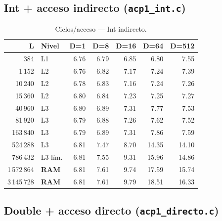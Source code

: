 \documentclass[12pt,a4paper]{article}
\newcommand{\cverde}[1]{\textcolor{verde}{#1}}
\newcommand{\cnaranja}[1]{\textcolor{naranja}{#1}}
\newcommand{\crojo}[1]{\textcolor{rojo}{#1}}
\begin{document}
\subsection{Int + acceso indirecto (\texttt{acp1\_int.c})}

\begin{table}[H]
\centering
\caption{Ciclos/acceso --- Int indirecto.}
\label{tab:int_ind}
\setlength{\tabcolsep}{5pt}\footnotesize
\begin{tabular}{rlrrrrr}
\toprule
\textbf{L} & \textbf{Nivel} & \textbf{D=1} & \textbf{D=8} & \textbf{D=16} & \textbf{D=64} & \textbf{D=512} \\
\midrule
384         & L1           & \cverde{6.76}  & \cverde{6.79}  & \cverde{6.85}  & \cverde{6.80}  & \cverde{7.55} \\
1\,152      & L2           & \cverde{6.76}  & \cverde{6.82}  & \cverde{7.17}  & \cverde{7.24}  & \cverde{7.39} \\
10\,240     & L2           & \cverde{6.78}  & \cverde{6.83}  & \cverde{7.16}  & \cverde{7.24}  & \cverde{7.26} \\
15\,360     & L2           & \cverde{6.80}  & \cverde{6.84}  & \cverde{7.23}  & \cverde{7.25}  & \cverde{7.27} \\
40\,960     & L3           & \cverde{6.80}  & \cverde{6.89}  & \cverde{7.31}  & \cverde{7.77}  & \cverde{7.53} \\
81\,920     & L3           & \cverde{6.79}  & \cverde{6.88}  & \cverde{7.26}  & \cverde{7.62}  & \cverde{7.52} \\
163\,840    & L3           & \cverde{6.79}  & \cverde{6.89}  & \cverde{7.31}  & \cverde{7.86}  & \cverde{7.59} \\
524\,288    & L3           & \cverde{6.81}  & \cverde{7.47}  & \cnaranja{8.70} & \crojo{14.35} & \crojo{14.10} \\
786\,432    & L3 lím.      & \cverde{6.81}  & \cverde{7.55}  & \cnaranja{9.31} & \crojo{15.96} & \crojo{14.86} \\
1\,572\,864 & \textbf{RAM} & \cverde{6.81}  & \cverde{7.61}  & \cnaranja{9.74} & \crojo{17.59} & \crojo{15.74} \\
3\,145\,728 & \textbf{RAM} & \cverde{6.81}  & \cverde{7.61}  & \cnaranja{9.79} & \crojo{18.51} & \crojo{16.33} \\
\bottomrule
\end{tabular}
\end{table}

\subsection{Double + acceso directo (\texttt{acp1\_directo.c})}
\end{document}
